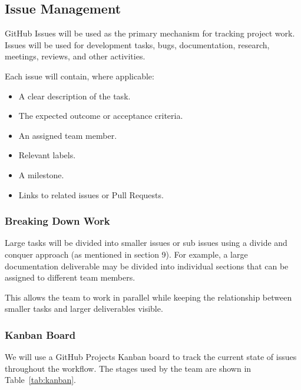 \documentclass{article}
\begin{document}

\subsection{Issue Management}

GitHub Issues will be used as the primary mechanism for tracking project work.
Issues will be used for development tasks, bugs, documentation, research,
meetings, reviews, and other activities.

Each issue will contain, where applicable:

\begin{itemize}
    \item A clear description of the task.
    \item The expected outcome or acceptance criteria.
    \item An assigned team member.
    \item Relevant labels.
    \item A milestone.
    \item Links to related issues or Pull Requests.
\end{itemize}


\subsubsection{Breaking Down Work}

Large tasks will be divided into smaller issues or sub issues using a
divide and conquer approach (as mentioned in section 9). For example, a large documentation deliverable
may be divided into individual sections that can be assigned to different
team members.

This allows the team to work in parallel while keeping the relationship
between smaller tasks and larger deliverables visible.


\subsubsection{Kanban Board}

We will use a GitHub Projects Kanban board to track the current state of
issues throughout the workflow. The stages used by the team are shown in
Table~\ref{tab:kanban}.
\end{document}
